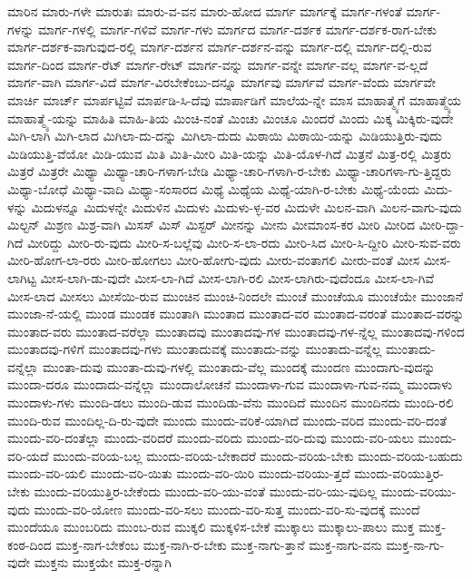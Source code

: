 {ಮಾರಿನ
ಮಾರು-ಗಳೇ
ಮಾರುತಃ
ಮಾರು-ವ-ವನ
ಮಾರು-ಹೋದ
ಮಾರ್ಗ
ಮಾರ್ಗಕ್ಕೆ
ಮಾರ್ಗ-ಗಳಂತೆ
ಮಾರ್ಗ-ಗಳನ್ನು
ಮಾರ್ಗ-ಗಳಲ್ಲಿ
ಮಾರ್ಗ-ಗಳಿವೆ
ಮಾರ್ಗ-ಗಳು
ಮಾರ್ಗದ
ಮಾರ್ಗ-ದರ್ಶಕ
ಮಾರ್ಗ-ದರ್ಶಕ-ರಾಗ-ಬೇಕು
ಮಾರ್ಗ-ದರ್ಶಕ-ವಾಗುವುದ-ರಲ್ಲಿ
ಮಾರ್ಗ-ದರ್ಶನ
ಮಾರ್ಗ-ದರ್ಶನ-ವನ್ನು
ಮಾರ್ಗ-ದಲ್ಲಿ
ಮಾರ್ಗ-ದಲ್ಲಿ-ರುವ
ಮಾರ್ಗ-ದಿಂದ
ಮಾರ್ಗ-ರೆಟ್
ಮಾರ್ಗ-ರೇಟ್
ಮಾರ್ಗ-ವನ್ನು
ಮಾರ್ಗ-ವನ್ನೇ
ಮಾರ್ಗ-ವಲ್ಲ
ಮಾರ್ಗ-ವ-ಲ್ಲದೆ
ಮಾರ್ಗ-ವಾಗಿ
ಮಾರ್ಗ-ವಿದೆ
ಮಾರ್ಗ-ವಿರಬೇಕೆಂಬು-ದನ್ನೂ
ಮಾರ್ಗವು
ಮಾರ್ಗವೆ
ಮಾರ್ಗ-ವೆಂದು
ಮಾರ್ಗವೇ
ಮಾರ್ಚಿ
ಮಾರ್ಚ್
ಮಾರ್ಪಟ್ಟಿವೆ
ಮಾರ್ಪಡಿ-ಸಿ-ದೆವು
ಮಾರ್ಪಾಡಿಗೆ
ಮಾಲೆಯ-ನ್ನೇ
ಮಾಸ
ಮಾಹಾತ್ಮ್ಯೆಗೆ
ಮಾಹಾತ್ಮ್ಯೆಯ
ಮಾಹಾತ್ಮ್ಯೆ-ಯನ್ನು
ಮಾಹಿತಿ
ಮಾಹಿ-ತಿಯ
ಮಿಂಚಿ-ನಂತೆ
ಮಿಂಚು
ಮಿಂಚೂ
ಮಿಂದರೆ
ಮಿಂದು
ಮಿಕ್ಕ
ಮಿಕ್ಕಿರು-ವುದೇ
ಮಿಗಿ-ಲಾಗಿ
ಮಿಗಿ-ಲಾದ
ಮಿಗಿಲಾ-ದು-ದನ್ನು
ಮಿಗಿಲಾ-ದುದು
ಮಿಠಾಯಿ
ಮಿಠಾಯಿ-ಯನ್ನು
ಮಿಡಿಯುತ್ತಿರು-ವುದು
ಮಿಡಿಯುತ್ತಿ-ವೆಯೋ
ಮಿಡಿ-ಯುವ
ಮಿತಿ
ಮಿತಿ-ಮೀರಿ
ಮಿತಿ-ಯನ್ನು
ಮಿತಿ-ಯೊಳ-ಗಿದೆ
ಮಿತ್ರನೆ
ಮಿತ್ರ-ರಲ್ಲಿ
ಮಿತ್ರರು
ಮಿತ್ರರೆ
ಮಿತ್ರರೇ
ಮಿಥ್ಯಾ
ಮಿಥ್ಯಾ-ಚಾರಿ-ಗಳಾಗ-ಬೇಡಿ
ಮಿಥ್ಯಾ-ಚಾರಿ-ಗಳಾಗಿ-ರ-ಬೇಕು
ಮಿಥ್ಯಾ-ಚಾರಿಗಳಾ-ಗು-ತ್ತಿದ್ದರು
ಮಿಥ್ಯಾ-ಬೋಧೆ
ಮಿಥ್ಯಾ-ವಾದಿ
ಮಿಥ್ಯಾ-ಸಂಸಾರದ
ಮಿಥ್ಯೆ
ಮಿಥ್ಯೆಯ
ಮಿಥ್ಯೆ-ಯಾಗಿ-ರ-ಬೇಕು
ಮಿಥ್ಯೆ-ಯೆಂದು
ಮಿದು-ಳನ್ನು
ಮಿದುಳನ್ನೂ
ಮಿದುಳನ್ನೇ
ಮಿದುಳಿನ
ಮಿದುಳು
ಮಿದುಳು-ಳ್ಳ-ವರ
ಮಿದುಳೇ
ಮಿಲನ-ವಾಗಿ
ಮಿಲನ-ವಾಗು-ವುದು
ಮಿಲ್ಟನ್
ಮಿಶ್ರಣ
ಮಿಶ್ರ-ವಾಗಿ
ಮಿಸಸ್
ಮಿಸ್
ಮಿಸ್ಟರ್
ಮೀನನ್ನು
ಮೀನು
ಮೀಮಾಂಸ-ಕರ
ಮೀರಿ
ಮೀರಿದ
ಮೀರಿ-ದ್ದಾ-ಗಿದೆ
ಮೀರಿದ್ದು
ಮೀರಿ-ರು-ವುದು
ಮೀರಿ-ಸ-ಬಲ್ಲೆವು
ಮೀರಿ-ಸ-ಲಾ-ರದು
ಮೀರಿ-ಸಿದ
ಮೀರಿ-ಸಿ-ದ್ದೀರಿ
ಮೀರಿ-ಸುವ-ವರು
ಮೀರಿ-ಹೋಗ-ಲಾ-ರರು
ಮೀರಿ-ಹೋಗಲು
ಮೀರಿ-ಹೋಗು-ವುದು
ಮೀರು-ವಂತಾಗಲಿ
ಮೀರು-ವಂತೆ
ಮೀಸ
ಮೀಸ-ಲಾಗಿಟ್ಟ
ಮೀಸ-ಲಾಗಿ-ಡು-ವುದೇ
ಮೀಸ-ಲಾ-ಗಿದೆ
ಮೀಸ-ಲಾಗಿ-ರಲಿ
ಮೀಸ-ಲಾಗಿರು-ವುದೆಂದೂ
ಮೀಸ-ಲಾ-ಗಿವೆ
ಮೀಸ-ಲಾದ
ಮೀಸಲು
ಮೀಸೆಯಿ-ರುವ
ಮುಂಚಿನ
ಮುಂಚಿ-ನಿಂದಲೇ
ಮುಂಚೆ
ಮುಂಚೆಯೂ
ಮುಂಚೆಯೇ
ಮುಂಜಾನೆ
ಮುಂಜಾ-ನೆ-ಯಲ್ಲಿ
ಮುಂಡ
ಮುಂಡಕ
ಮುಂತಾಗಿ
ಮುಂತಾದ
ಮುಂತಾದ-ವರ
ಮುಂತಾದ-ವರಂತೆ
ಮುಂತಾದ-ವರನ್ನು
ಮುಂತಾದ-ವರು
ಮುಂತಾದ-ವರೆಲ್ಲಾ
ಮುಂತಾದವು
ಮುಂತಾದವು-ಗಳ
ಮುಂತಾದವು-ಗಳ-ನ್ನೆಲ್ಲ
ಮುಂತಾದವು-ಗಳಿಂದ
ಮುಂತಾದವು-ಗಳಿಗೆ
ಮುಂತಾದವು-ಗಳು
ಮುಂತಾದುವಕ್ಕೆ
ಮುಂತಾದು-ವನ್ನು
ಮುಂತಾದು-ವನ್ನೆಲ್ಲ
ಮುಂತಾದು-ವನ್ನೆಲ್ಲಾ
ಮುಂತಾ-ದುವು
ಮುಂತಾ-ದುವು-ಗಳಲ್ಲಿ
ಮುಂತಾದು-ವೆಲ್ಲ
ಮುಂದಕ್ಕೆ
ಮುಂದಣ
ಮುಂದಾಗು-ವುದನ್ನು
ಮುಂದಾ-ದರೂ
ಮುಂದಾದು-ವನ್ನೆಲ್ಲಾ
ಮುಂದಾಲೋಚನೆ
ಮುಂದಾಳಾ-ಗುವ
ಮುಂದಾಳಾ-ಗುವ-ನಮ್ಮ
ಮುಂದಾಳು
ಮುಂದಾಳು-ಗಳು
ಮುಂದಿ-ಡಲು
ಮುಂದಿ-ಡುವ
ಮುಂದಿಡು-ವೆನು
ಮುಂದಿದೆ
ಮುಂದಿನ
ಮುಂದಿನದು
ಮುಂದಿ-ರಲಿ
ಮುಂದಿ-ರುವ
ಮುಂದಿಲ್ಲ-ದಿ-ರು-ವುದೇ
ಮುಂದು
ಮುಂದು-ವರಿಕೆ-ಯಾಗಿದೆ
ಮುಂದು-ವರಿದ
ಮುಂದು-ವರಿ-ದಂತೆ
ಮುಂದು-ವರಿ-ದಂತೆಲ್ಲಾ
ಮುಂದು-ವರಿದರೆ
ಮುಂದು-ವರಿದು
ಮುಂದು-ವರಿ-ದುವು
ಮುಂದು-ವರಿ-ಯಲು
ಮುಂದು-ವರಿ-ಯದೆ
ಮುಂದು-ವರಿಯ-ಬಲ್ಲ
ಮುಂದು-ವರಿಯ-ಬೇಕಾದರೆ
ಮುಂದು-ವರಿಯ-ಬೇಕು
ಮುಂದು-ವರಿಯ-ಬಹುದು
ಮುಂದು-ವರಿ-ಯಲಿ
ಮುಂದು-ವರಿ-ಯಿತು
ಮುಂದು-ವರಿ-ಯಿರಿ
ಮುಂದು-ವರಿಯು-ತ್ತದೆ
ಮುಂದು-ವರಿಯುತ್ತಿರ-ಬೇಕು
ಮುಂದು-ವರಿಯುತ್ತಿರ-ಬೇಕೆಂದು
ಮುಂದು-ವರಿ-ಯು-ವಂತೆ
ಮುಂದು-ವರಿ-ಯು-ವುದಿಲ್ಲ
ಮುಂದು-ವರಿಯು-ವುದು
ಮುಂದು-ವರಿ-ಯೋಣ
ಮುಂದು-ವರಿ-ಸಲು
ಮುಂದು-ವರಿ-ಸುತ್ತ
ಮುಂದು-ವರಿ-ಸು-ವುದಕ್ಕೆ
ಮುಂದೆ
ಮುಂದೆಯೂ
ಮುಂಬರಿದು
ಮುಂಬ-ರುವ
ಮುಕ್ಕಲಿ
ಮುಕ್ಕಳಿಸ-ಬೇಕೆ
ಮುಕ್ಕಾಲು
ಮುಕ್ಕಾಲು-ಪಾಲು
ಮುಕ್ತ
ಮುಕ್ತ-ಕಂಠ-ದಿಂದ
ಮುಕ್ತ-ನಾಗ-ಬೇಕೆಂಬ
ಮುಕ್ತ-ನಾಗಿ-ರ-ಬೇಕು
ಮುಕ್ತ-ನಾಗು-ತ್ತಾನೆ
ಮುಕ್ತ-ನಾಗು-ವನು
ಮುಕ್ತ-ನಾ-ಗು-ವುದೇ
ಮುಕ್ತನು
ಮುಕ್ತಯೇ
ಮುಕ್ತ-ರನ್ನಾಗಿ
}

